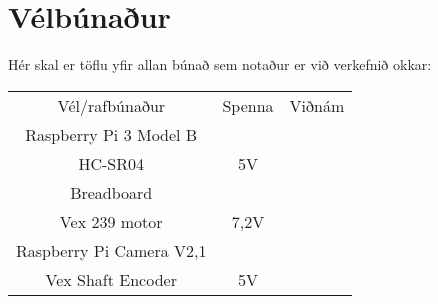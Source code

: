 \section{Vélbúnaður}
Hér skal er töflu yfir allan búnað sem notaður er við verkefnið okkar:

\begin{center}
\begin{tabular}{ |c|c|c| } 
 \hline
 Vél/rafbúnaður &Spenna &Viðnám\\ 
 Raspberry Pi 3 Model B & &\\ 
 HC-SR04 &5V &  \\ 
 Breadboard & & \\
 Vex 239 motor & 7,2V & \\
 Raspberry Pi Camera V2,1 & & \\
 Vex Shaft Encoder & 5V & \\
 \hline
\end{tabular}
\end{center}